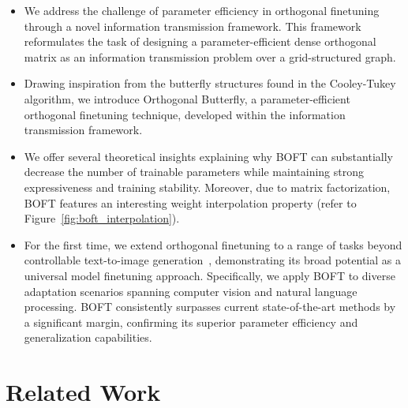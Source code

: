 \begin{itemize}[leftmargin=*,nosep]
    \item We address the challenge of parameter efficiency in orthogonal finetuning through a novel information transmission framework. This framework reformulates the task of designing a parameter-efficient dense orthogonal matrix as an information transmission problem over a grid-structured graph.
    \item Drawing inspiration from the butterfly structures found in the Cooley-Tukey algorithm, we introduce Orthogonal Butterfly, a parameter-efficient orthogonal finetuning technique, developed within the information transmission framework.
    \item We offer several theoretical insights explaining why BOFT can substantially decrease the number of trainable parameters while maintaining strong expressiveness and training stability. Moreover, due to matrix factorization, BOFT features an interesting weight interpolation property (refer to Figure~\ref{fig:boft_interpolation}).
    \item For the first time, we extend orthogonal finetuning to a range of tasks beyond controllable text-to-image generation~\cite{qiu2023controlling}, demonstrating its broad potential as a universal model finetuning approach. Specifically, we apply BOFT to diverse adaptation scenarios spanning computer vision and natural language processing. BOFT consistently surpasses current state-of-the-art methods by a significant margin, confirming its superior parameter efficiency and generalization capabilities.
\end{itemize}

\section{Related Work}

